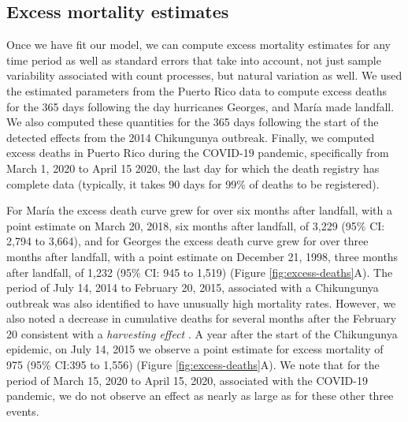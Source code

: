 \documentclass[11pt]{article}
\begin{document}
\subsection{Excess mortality estimates}
\label{subsec:excess-mortality}
Once we have fit our model, we can compute excess mortality estimates for any time period as well as standard errors that take into account, not just sample variability associated with count processes, but natural variation as well. We used the estimated parameters from the Puerto Rico data to compute excess deaths for the 365 days following the day hurricanes Georges, and Mar\'ia made landfall. We also computed these quantities for the 365 days following the start of the detected effects from the 2014 Chikungunya outbreak. Finally, we computed excess deaths in Puerto Rico during the COVID-19 pandemic, specifically from March 1, 2020 to April 15 2020, the last day for which the death registry has complete data (typically, it takes 90 days for 99\% of deaths to be registered). 

For Mar\'ia the excess death curve grew for over six months after landfall, with a point estimate on March 20, 2018, six months after landfall, of 3,229 (95\% CI: 2,794 to 3,664), and for Georges the excess death curve grew for over three months after landfall, with a point estimate on December 21, 1998, three months after landfall, of 1,232 (95\% CI: 945 to 1,519) (Figure \ref{fig:excess-deaths}A). The period of July 14, 2014 to February 20, 2015, associated with a Chikungunya outbreak was also identified to have unusually high mortality rates. However, we also noted a decrease in cumulative deaths for several months after the February 20 consistent with a \emph{harvesting effect} \cite{hajat2005mortality, dushoff2006mortality}. A year after the start of the Chikungunya epidemic, on July 14, 2015 we observe a point estimate for excess mortality of 975 (95\% CI:395 to 1,556) (Figure \ref{fig:excess-deaths}A). We note that for the period of March 15, 2020 to April 15, 2020, associated with the COVID-19 pandemic, we do not observe an effect as nearly as large as for these other three events.
\end{document}
